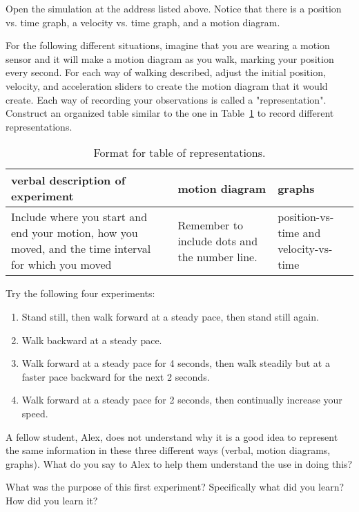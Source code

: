 \begin{steps}
	\item Open the simulation at the address listed above. Notice that there is a position vs. time graph, a velocity vs. time graph, and a motion diagram.
	
	\item For the following different situations, imagine that you are wearing a motion sensor and it will make a motion diagram as you walk, marking your position every second. For each way of walking described, adjust the initial position, velocity, and acceleration sliders to create the motion diagram that it would create. Each way of recording your observations is called a "representation". Construct an organized table similar to the one in Table\ \ref{1dk:tab:reps} to record different representations.
	
	\begin{table}
		\begin{tabular}{p{}|p{}|p{}}
			\textbf{verbal description of experiment} & \textbf{motion diagram} & \textbf{graphs} \\
			\hline
			Include where you start and end your motion, how you moved, and the time interval for which you moved & Remember to include dots and the number line. & position-vs-time and velocity-vs-time
		\end{tabular}
		
		\caption{Format for table of representations.}\label{1dk:tab:reps}
		
	\end{table}
	
	Try the following four experiments:
	
	\begin{enumerate}
		\item Stand still, then walk forward at a steady pace, then stand still again.
		
		\item Walk backward at a steady pace.
		
		\item Walk forward at a steady pace for 4 seconds, then walk steadily but at a faster pace backward for the next 2 seconds.
		
		\item Walk forward at a steady pace for 2 seconds, then continually increase your speed.
	\end{enumerate}
	
	\item A fellow student, Alex, does not understand why it is a good idea to represent the same information in these three different ways (verbal, motion diagrams, graphs). What do you say to Alex to help them understand the use in doing this?
	
	\item What was the purpose of this first experiment? Specifically what did you learn? How did you learn it?
	
\end{steps}

